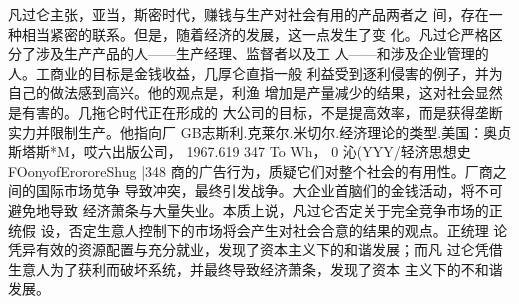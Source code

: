凡过仑主张，亚当，斯密时代，赚钱与生产对社会有用的产品两者之
间，存在一种相当紧密的联系。但是，随着经济的发展，这一点发生了变
化。凡过仑严格区分了涉及生产产品的人——生产经理、监督者以及工
人——和涉及企业管理的人。工商业的目标是金钱收益，几厚仑直指一般
利益受到逐利侵害的例子，并为自己的做法感到高兴。他的观点是，利渔
增加是产量减少的结果，这对社会显然是有害的。几拖仑时代正在形成的
大公司的目标，不是提高效率，而是获得垄断实力并限制生产。他指向厂
GB志斯利.克莱尔.米切尔.经济理论的类型.美国：奥贞斯塔斯*M，哎六出版公司，
1967.619
347
To
Wh，
0
沁(YYY/轻济思想史
FOonyofErororeShug
|348
商的广告行为，质疑它们对整个社会的有用性。厂商之间的国际市场苋争
导致冲突，最终引发战争。大企业首脑们的金钱活动，将不可避免地导致
经济萧条与大量失业。本质上说，凡过仑否定关于完全竞争市场的正统假
设，否定生意人控制下的市场将会产生对社会合意的结果的观点。正统理
论凭异有效的资源配置与充分就业，发现了资本主义下的和谐发展；而凡
过仑凭借生意人为了获利而破坏系统，并最终导致经济萧条，发现了资本
主义下的不和谐发展。


